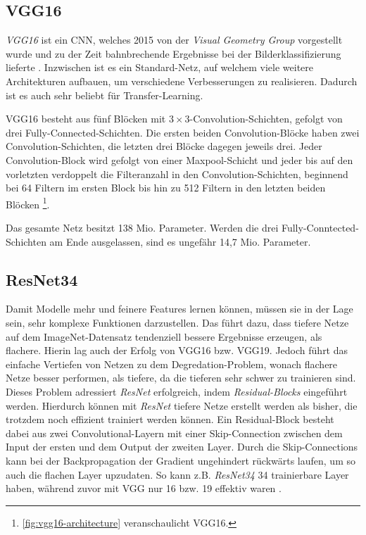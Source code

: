 \subsection{VGG16} \label{sec:pretrained-backbones:vgg16}

\textit{VGG16} ist ein \ac{CNN}, welches 2015 von der \textit{Visual Geometry Group} vorgestellt wurde 
und zu der Zeit bahnbrechende Ergebnisse bei der Bilderklassifizierung lieferte \cite{Simonyan.04092014}. 
Inzwischen ist es ein Standard-Netz, auf welchem viele weitere Architekturen aufbauen,
um verschiedene Verbesserungen zu realisieren. 
Dadurch ist es auch sehr beliebt für Transfer-Learning. 

VGG16 besteht aus fünf Blöcken mit $3{\times}3$-Convolution-Schichten,
gefolgt von drei Fully-Connected-Schichten. Die ersten beiden Convolution-Blöcke haben zwei Convolution-Schichten,
die letzten drei Blöcke dagegen jeweils drei. 
Jeder Convolution-Block wird gefolgt von einer Maxpool-Schicht und jeder bis auf den vorletzten verdoppelt die Filteranzahl in den Convolution-Schichten,
beginnend bei 64 Filtern im ersten Block bis hin zu 512 Filtern in den letzten beiden Blöcken \cite{Simonyan.04092014}\footnote{\autoref{fig:vgg16-architecture} veranschaulicht VGG16.}. 

Das gesamte Netz besitzt 138 Mio. Parameter. Werden die drei Fully-Conntected-Schichten am Ende ausgelassen, 
sind es ungefähr 14,7 Mio. Parameter. 

\subsection{ResNet34} \label{sec:pretrained-backbones:resnet}

Damit Modelle mehr und feinere Features lernen können, müssen sie in der Lage sein, sehr komplexe Funktionen darzustellen. 
Das führt dazu, dass tiefere Netze auf dem ImageNet-Datensatz tendenziell bessere Ergebnisse erzeugen, als flachere. 
Hierin lag auch der Erfolg von VGG16 bzw. VGG19. Jedoch führt das einfache Vertiefen von Netzen zu dem Degredation-Problem, wonach 
flachere Netze besser performen, als tiefere, da die tieferen sehr schwer zu trainieren sind. \\
Dieses Problem adressiert \textit{ResNet} erfolgreich, indem \textit{Residual-Blocks} eingeführt werden. 
Hierdurch können mit \textit{ResNet} tiefere Netze erstellt werden als bisher, die trotzdem noch effizient trainiert werden können.
Ein Residual-Block besteht dabei aus zwei Convolutional-Layern mit einer Skip-Connection zwischen dem Input der ersten und dem Output 
der zweiten Layer. Durch die Skip-Connections kann bei der Backpropagation der Gradient ungehindert rückwärts laufen, 
um so auch die flachen Layer upzudaten. So kann z.B. \textit{ResNet34} 34 trainierbare Layer haben, 
während zuvor mit VGG nur 16 bzw. 19 effektiv waren \cite{He.10122015}. 


